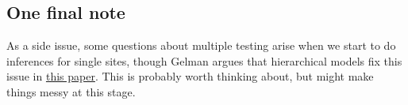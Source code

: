 \documentclass[]{article}
\begin{document}
\subsection{One final note}

As a side issue, some questions about multiple testing arise when we start to do inferences for single sites, though Gelman argues that hierarchical models fix this issue in \href{https://arxiv.org/pdf/0907.2478.pdf}{this paper}.
This is probably worth thinking about, but might make things messy at this stage.


	
\end{document}
